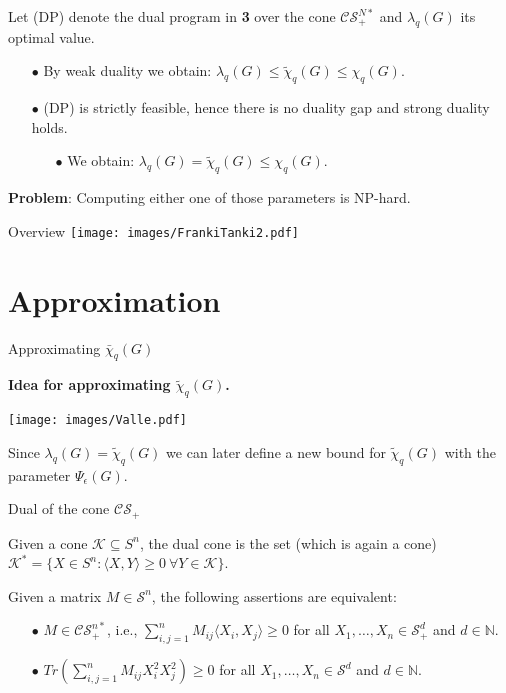 \documentclass[13.5pt]{beamer}
\begin{document}
\begin{frame}
Let (DP) denote the dual program in \textbf{3} over the cone $\mathcal{CS}_+^{N*}$ and $\lambda_q(G)$ its optimal value. 
\pause
\begin{itemize}
\item[$\bullet$] By weak duality we obtain: $\lambda_q(G) \leq \tilde{\chi}_q(G) \leq \chi_q(G)$.
\item[$\bullet$] (DP) is strictly feasible, hence there is no duality gap and strong duality holds.
\begin{itemize}
\item[$\bullet$] We obtain: $\lambda_q(G) = \tilde{\chi}_q(G) \leq \chi_q(G)$.
\end{itemize}
\end{itemize}
\pause
\textbf{Problem}: Computing either one of those parameters is NP-hard.
\end{frame}

\begin{frame}{Overview}
\texttt{[image: images/FrankiTanki2.pdf]}
\end{frame}

\section{Approximation}
\begin{frame}{Approximating $\bar{\chi}_q(G)$}
\begin{block}{\color{colorblue}\textbf{Idea for approximating $\tilde{\chi}_q(G)$.}}
\end{block}
\texttt{[image: images/Valle.pdf]}

Since $\lambda_q(G)= \tilde{\chi}_q(G)$ we can later define a new bound for $\tilde{\chi}_q(G)$ with the parameter $\Psi_{\epsilon}(G)$.
\end{frame}

\begin{frame}{Dual of the cone $\mathcal{CS}_+$}
\begin{definition}
Given a cone $\mathcal{K} \subseteq S^n$, the dual cone is the set (which is again a cone) $\mathcal{K}^* = \{ X \in S^n : \langle X,Y \rangle \geq 0~\forall Y \in \mathcal{K}\}$.
\end{definition}
\pause
\begin{lemma}
Given a matrix $M \in \mathcal{S}^n$, the following assertions are equivalent:
		\begin{itemize}
			\item[$\bullet$] $M \in \mathcal{CS}_+^{n*}$, i.e., $\sum \limits_{i,j=1}^n M_{ij} \langle X_i,X_j \rangle \geq 0$ for all $X_1,\ldots,X_n \in \mathcal{S}_+^d$ and $d\in \mathbb{N}$.
            
            \item[$\bullet$] $Tr(\sum \limits_{i,j=1}^n M_{ij} X_i^2X_j^2) \geq 0$ for all $X_1,\ldots,X_n \in \mathcal{S}^d$ and $d \in \mathbb{N}$.
            \end{itemize}
\end{lemma}
\end{frame}
\end{document}
